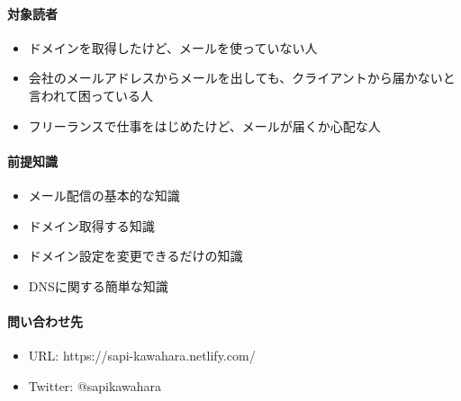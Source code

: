 \paragraph*{対象読者}
\label{sec:-0-0-0-2}

\begin{itemize}
\item ドメインを取得したけど、メールを使っていない人
\item 会社のメールアドレスからメールを出しても、クライアントから届かないと言われて困っている人
\item フリーランスで仕事をはじめたけど、メールが届くか心配な人
\end{itemize}

\paragraph*{前提知識}
\label{sec:-0-0-0-3}

\begin{itemize}
\item メール配信の基本的な知識
\item ドメイン取得する知識
\item ドメイン設定を変更できるだけの知識
\item DNSに関する簡単な知識
\end{itemize}

\paragraph*{問い合わせ先}
\label{sec:-0-0-0-4}

\begin{itemize}
\item URL: https://sapi{-}kawahara.netlify.com/
\item Twitter: @sapi\textunderscore{}kawahara
\end{itemize}
